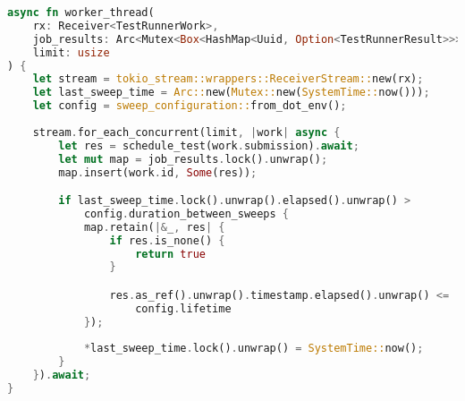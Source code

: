 \begin{lstlisting}[language=rust, escapechar=~, caption={Temp}, label={lst:sweeping}]
async fn worker_thread(
    rx: Receiver<TestRunnerWork>,
    job_results: Arc<Mutex<Box<HashMap<Uuid, Option<TestRunnerResult>>>>>,
    limit: usize
) {
    let stream = tokio_stream::wrappers::ReceiverStream::new(rx);
    let last_sweep_time = Arc::new(Mutex::new(SystemTime::now()));
    let config = sweep_configuration::from_dot_env();
    
    stream.for_each_concurrent(limit, |work| async {
        let res = schedule_test(work.submission).await;
        let mut map = job_results.lock().unwrap();
        map.insert(work.id, Some(res));

        if last_sweep_time.lock().unwrap().elapsed().unwrap() > 
            config.duration_between_sweeps {
            map.retain(|&_, res| {
                if res.is_none() {
                    return true
                }

                res.as_ref().unwrap().timestamp.elapsed().unwrap() <= 
                    config.lifetime
            });
            
            *last_sweep_time.lock().unwrap() = SystemTime::now();
        }
    }).await;
}
\end{lstlisting}